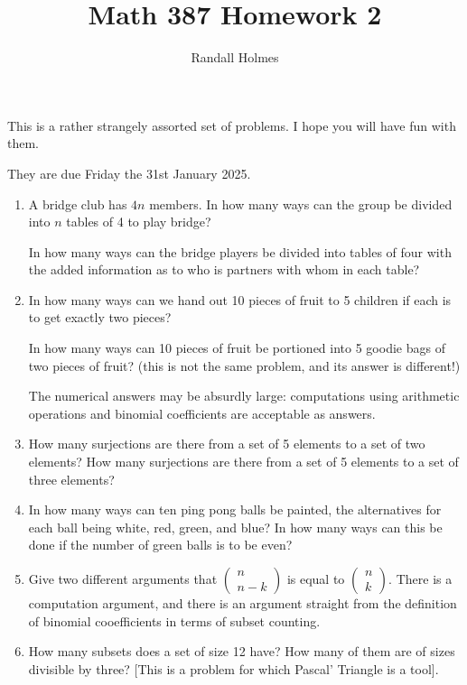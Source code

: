 \documentclass[12pt]{article}
\title{Math 387 Homework 2}
\author{Randall Holmes}
\begin{document}
\maketitle

This is a rather strangely assorted set of problems.  I hope you will have fun with them.

They are due Friday the 31st January 2025.

\begin{enumerate}

\item  A bridge club has $4n$ members.  In how many ways can the group be divided into $n$ tables of 4 to play bridge?

In how many ways can the bridge players be divided into tables of four with the added information as to who is partners with whom in each table?

\item  In how many ways can we hand out 10 pieces of fruit to 5 children if each is to get exactly two pieces?

In how many ways can 10 pieces of fruit be portioned into 5 goodie bags of two pieces of fruit?  (this is not the same problem, and its answer is different!)

The numerical answers may be absurdly large:  computations using arithmetic operations and binomial coefficients are acceptable as answers.

\item  How many surjections are there from a set of 5 elements to a set of two elements?  How many surjections are there from a set of 5 elements to a set of three elements?

\item   In how many ways can ten ping pong balls be painted, the alternatives for each ball being white, red, green, and blue?  In how many ways can this be done if the number of green balls is to be even?

\item  Give two different arguments  that $\left(\begin{array}{c}n \\n-k\end{array}\right)$ is equal to $\left(\begin{array}{c}n \\k\end{array}\right)$.  There is a computation argument, and there is an argument straight from the definition of binomial cooefficients in terms of subset counting.

\item  How many subsets does a set of size 12 have?  How many of them are of sizes divisible by three?  [This is a problem for which Pascal' Triangle is a tool].

\end{enumerate}
\end{document}
